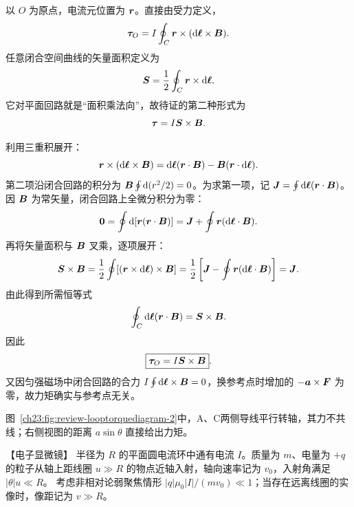 {\begin{xesolution}
以 $O$ 为原点，电流元位置为 $\bm{r}$。直接由受力定义，
\begin{equation}
  \bm{\tau}_O=I\oint_C\bm{r}\times
  (\mathop{}\!\mathrm d\bm{\ell}\times\bm{B}).
\end{equation}
任意闭合空间曲线的矢量面积定义为
\begin{equation}
  \bm{S}=\frac12\oint_C\bm{r}\times\mathop{}\!\mathrm d\bm{\ell}.
\end{equation}
它对平面回路就是“面积乘法向”，故待证的第二种形式为
\[
  \bm{\tau}=I\bm{S}\times\bm{B}.
\]

利用三重积展开：
\[
  \bm{r}\times(\mathop{}\!\mathrm d\bm{\ell}\times\bm{B})
  =\mathop{}\!\mathrm d\bm{\ell}(\bm{r}\cdot\bm{B})
  -\bm{B}(\bm{r}\cdot\mathop{}\!\mathrm d\bm{\ell}).
\]
第二项沿闭合回路的积分为
$\bm{B}\oint\mathop{}\!\mathrm d(r^2/2)=0$。为求第一项，记
$\bm{J}=\oint\mathop{}\!\mathrm d\bm{\ell}(\bm{r}\cdot\bm{B})$。因 $\bm{B}$ 为常矢量，闭合回路上全微分积分为零：
\[
  \bm{0}=\oint\mathop{}\!\mathrm d[\bm{r}(\bm{r}\cdot\bm{B})]
  =\bm{J}+\oint\bm{r}(\mathop{}\!\mathrm d\bm{\ell}\cdot\bm{B}).
\]
再将矢量面积与 $\bm{B}$ 叉乘，逐项展开：
\[
  \bm{S}\times\bm{B}
  =\frac12\oint[(\bm{r}\times\mathop{}\!\mathrm d\bm{\ell})\times\bm{B}]
  =\frac12\left[\bm{J}-\oint\bm{r}(\mathop{}\!\mathrm d\bm{\ell}\cdot\bm{B})\right]
  =\bm{J}.
\]
由此得到所需恒等式
\[
  \oint_C\mathop{}\!\mathrm d\bm{\ell}(\bm{r}\cdot\bm{B})=\bm{S}\times\bm{B}.
\]
因此
\begin{equation}
  \boxed{\bm{\tau}_O=I\bm{S}\times\bm{B}}.
\end{equation}
又因匀强磁场中闭合回路的合力
$I\oint\mathop{}\!\mathrm d\bm{\ell}\times\bm{B}=0$，换参考点时增加的
$-\bm{a}\times\bm{F}$ 为零，故力矩确实与参考点无关。

图~\ref{ch23:fig:review-looptorquediagram-2}中，A、C两侧导线平行转轴，其力不共线；右侧视图的距离 $a\sin\theta$ 直接给出力矩。
\par\noindent\begin{minipage}{\linewidth}
\loopTorqueDiagram
{}
\end{minipage}\par\medskip
\end{xesolution}



\begin{origexamplebox}{【电子显微镜】}\label{ch23:ex:s39-8-8}
半径为 $R$ 的平面圆电流环中通有电流 $I$。质量为 $m$、电量为 $+q$ 的粒子从轴上距线圈
$u\gg R$ 的物点近轴入射，轴向速率记为 $v_0$，入射角满足 $|\theta|u\ll R$。
考虑非相对论弱聚焦情形 $|q|\mu_0|I|/(mv_0)\ll1$；当存在远离线圈的实像时，像距记为 $v\gg R$。


\end{origexamplebox}}
